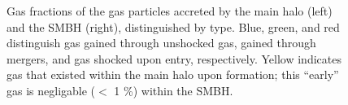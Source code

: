 \documentclass[manuscript]{aastex}
\begin{document}
\begin{figure}
\centerline{}
\caption[]{Gas fractions of the gas particles accreted by the main halo (left) and the SMBH (right), distinguished by type. Blue, green, and red distinguish gas gained through unshocked gas, gained through mergers, and gas shocked upon entry, respectively. Yellow indicates gas that existed within the main halo upon formation; this ``early'' gas is negligable ($<$ 1 \%) within the SMBH.}
\label{hrh258stackfrac} 
\end{figure}
\end{document}
